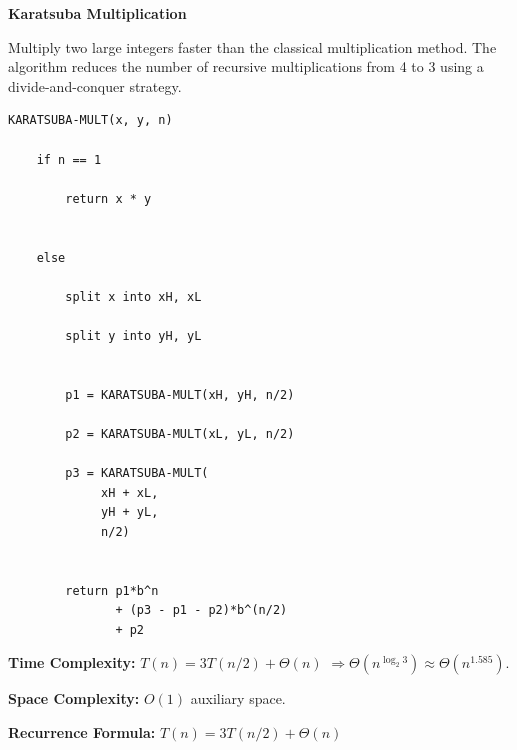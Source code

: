 \documentclass[a4paper,12pt]{article}
\begin{document}
\begin{tcolorbox}[
    colback=gray!30,
    colframe=black,
    boxrule=1pt,
    arc=0mm
]

\begin{tcolorbox}[
    colback=gray!10,
    colframe=black,
    arc=0mm
]
\centering
{\Huge\bfseries Karatsuba Multiplication}
\end{tcolorbox}


\begin{tcolorbox}[
    colback=gray!10,
    colframe=black,
    arc=0mm
]
\small
Multiply two large integers faster than the classical multiplication method.
The algorithm reduces the number of recursive multiplications from 4 to 3
using a divide-and-conquer strategy.
\end{tcolorbox}


\begin{tcolorbox}[
    colback=black!5,
    colframe=black,
    arc=0mm,
    title=Pseudo-code
]
\tiny
\begin{lstlisting}
KARATSUBA-MULT(x, y, n)

    if n == 1

        return x * y


    else

        split x into xH, xL

        split y into yH, yL


        p1 = KARATSUBA-MULT(xH, yH, n/2)

        p2 = KARATSUBA-MULT(xL, yL, n/2)

        p3 = KARATSUBA-MULT(
             xH + xL,
             yH + yL,
             n/2)


        return p1*b^n
               + (p3 - p1 - p2)*b^(n/2)
               + p2
\end{lstlisting}
\end{tcolorbox}


\begin{tcolorbox}[
    colback=cyan!20,
    colframe=black,
    arc=0mm
]
\small
\textbf{Time Complexity:}
$T(n)=3T(n/2)+\Theta(n)$
$\Rightarrow \Theta(n^{\log_2 3}) \approx \Theta(n^{1.585})$.
\end{tcolorbox}


\begin{tcolorbox}[
    colback=violet!20,
    colframe=black,
    arc=0mm
]
\small
\textbf{Space Complexity:}
$O(1)$ auxiliary space.
\end{tcolorbox}


\begin{tcolorbox}[
    colback=pink!20,
    colframe=black,
    arc=0mm
]
\small
\textbf{Recurrence Formula:}
$T(n)=3T(n/2)+\Theta(n)$
\end{tcolorbox}

\end{tcolorbox}
\end{document}
